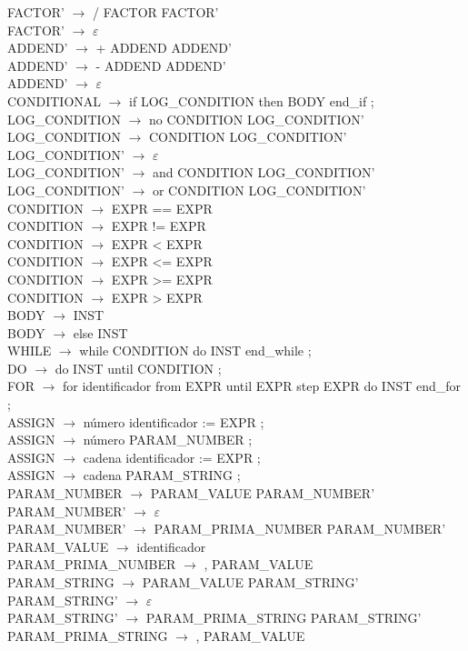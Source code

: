 \documentclass[a4paper,12pt,twoside,openright]{report}
\begin{document}
FACTOR’ $\rightarrow$ / FACTOR FACTOR’\\
FACTOR’ $\rightarrow$ $\varepsilon$\\
ADDEND’ $\rightarrow$ + ADDEND ADDEND’\\
ADDEND’ $\rightarrow$ - ADDEND ADDEND’\\
ADDEND’ $\rightarrow$ $\varepsilon$\\
CONDITIONAL $\rightarrow$ if LOG\_CONDITION then BODY end\_if ;\\
LOG\_CONDITION $\rightarrow$ no CONDITION LOG\_CONDITION’\\
LOG\_CONDITION $\rightarrow$ CONDITION LOG\_CONDITION’\\
LOG\_CONDITION’ $\rightarrow$ $\varepsilon$\\
LOG\_CONDITION’ $\rightarrow$ and CONDITION LOG\_CONDITION’\\
LOG\_CONDITION’ $\rightarrow$ or CONDITION LOG\_CONDITION’\\
CONDITION $\rightarrow$ EXPR == EXPR\\
CONDITION $\rightarrow$ EXPR != EXPR\\
CONDITION $\rightarrow$ EXPR < EXPR\\
CONDITION $\rightarrow$ EXPR <= EXPR\\
CONDITION $\rightarrow$ EXPR >= EXPR\\
CONDITION $\rightarrow$ EXPR > EXPR\\
BODY $\rightarrow$ INST\\
BODY $\rightarrow$ else INST\\
WHILE $\rightarrow$ while CONDITION do INST end\_while ;\\
DO $\rightarrow$ do INST until CONDITION ;\\
FOR $\rightarrow$ for identificador from EXPR until EXPR step EXPR do INST end\_for ;\\
ASSIGN $\rightarrow$ número identificador := EXPR ;\\
ASSIGN $\rightarrow$ número PARAM\_NUMBER ;\\
ASSIGN $\rightarrow$ cadena identificador := EXPR ;\\
ASSIGN $\rightarrow$ cadena PARAM\_STRING ;\\
PARAM\_NUMBER $\rightarrow$ PARAM\_VALUE PARAM\_NUMBER’\\
PARAM\_NUMBER’ $\rightarrow$ $\varepsilon$\\
PARAM\_NUMBER’ $\rightarrow$ PARAM\_PRIMA\_NUMBER PARAM\_NUMBER’\\
PARAM\_VALUE $\rightarrow$ identificador\\
PARAM\_PRIMA\_NUMBER $\rightarrow$ , PARAM\_VALUE\\
PARAM\_STRING $\rightarrow$ PARAM\_VALUE PARAM\_STRING’\\
PARAM\_STRING’ $\rightarrow$ $\varepsilon$\\
PARAM\_STRING’ $\rightarrow$ PARAM\_PRIMA\_STRING PARAM\_STRING’\\
PARAM\_PRIMA\_STRING $\rightarrow$ , PARAM\_VALUE\\
\end{document}
